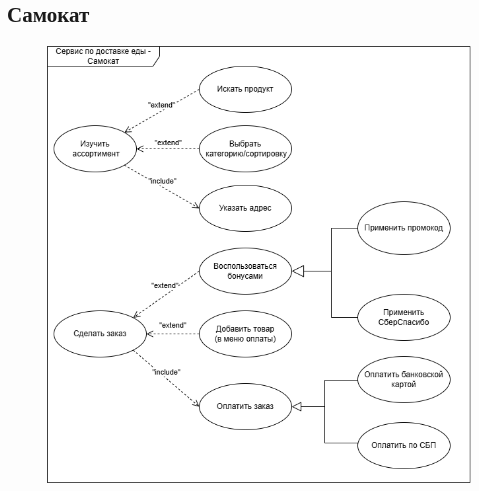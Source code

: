 \documentclass[a4paper]{report}
\begin{document}
\subsection{Самокат}
\begin{figure}[H]
    \centering
    \includegraphics[width=\textwidth]{Диаграмма вариантов использования Самокат.png}
\end{figure}
\newpage
\end{document}
